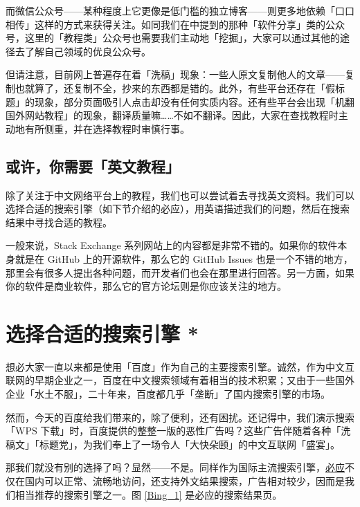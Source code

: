 而微信公众号——某种程度上它更像是低门槛的独立博客——则更多地依赖「口口相传」这样的方式来获得关注。如同我们在中提到的那种「软件分享」类的公众号，这里的「教程类」公众号也需要我们主动地「挖掘」，大家可以通过其他的途径去了解自己领域的优良公众号。

但请注意，目前网上普遍存在着「洗稿」现象：一些人原文复制他人的文章——复制也就算了，还复制不全，抄来的东西都是错的。此外，有些平台还存在「假标题」的现象，部分页面吸引人点击却没有任何实质内容。还有些平台会出现「机翻国外网站教程」的现象，翻译质量嘛……不如不翻译。因此，大家在查找教程时主动地有所侧重，并在选择教程时审慎行事。

\subsection{或许，你需要「英文教程」}

除了关注于中文网络平台上的教程，我们也可以尝试着去寻找英文资料。我们可以选择合适的搜索引擎（如下节介绍的必应），用英语描述我们的问题，然后在搜索结果中寻找合适的教程。

一般来说，Stack Exchange 系列网站上的内容都是非常不错的。如果你的软件本身就是在 GitHub 上的开源软件，那么它的 GitHub Issues 也是一个不错的地方，那里会有很多人提出各种问题，而开发者们也会在那里进行回答。另一方面，如果你的软件是商业软件，那么它的官方论坛则是你应该关注的地方。

\section{选择合适的搜索引擎 *}

想必大家一直以来都是使用「百度」作为自己的主要搜索引擎。诚然，作为中文互联网的早期企业之一，百度在中文搜索领域有着相当的技术积累；又由于一些国外企业「水土不服」，二十年来，百度都几乎「垄断」了国内搜索引擎的市场。

然而，今天的百度给我们带来的，除了便利，还有困扰。还记得中，我们演示搜索「WPS 下载」时，百度提供的整整一版的恶性广告吗？这些广告伴随着各种「洗稿文」「标题党」，为我们奉上了一场令人「大快朵颐」的中文互联网「盛宴」。

那我们就没有别的选择了吗？显然——不是。同样作为国际主流搜索引擎，\href{https://cn.bing.com/}{必应}不仅在国内可以正常、流畅地访问，还支持外文结果搜索，广告相对较少，因而是我们相当推荐的搜索引擎之一。图 \ref{Bing_1} 是必应的搜索结果页。


